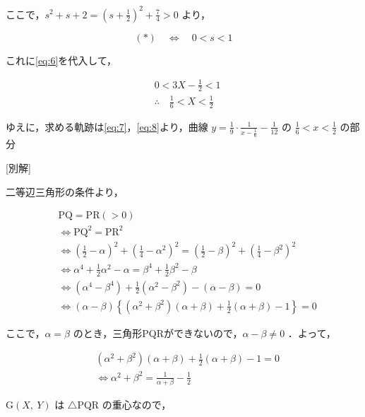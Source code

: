 \documentclass[a4paper]{ltjsarticle}
\begin{document}
ここで，$s^2+s+2=\left(s+\frac{1}{2}\right)^2+\frac{7}{4}>0$ より，

\begin{equation*}
    (*)\quad\Longleftrightarrow\quad 0<s<1
\end{equation*}

これに\eqref{eq:6}を代入して，

\begin{align}
     & 0<3X-\frac{1}{2}<1\nonumber                          \\
     & \therefore\quad\frac{1}{6}<X<\frac{1}{2}\label{eq:8}
\end{align}

ゆえに，求める軌跡は\eqref{eq:7}，\eqref{eq:8}より，曲線 $y=\frac{1}{9}\cdot\frac{1}{x-\frac{1}{6}}-\frac{1}{12}$ の $\frac{1}{6}<x<\frac{1}{2}$ の部分

[別解]

二等辺三角形の条件より，

\begin{align*}
     & \text{PQ}=\text{PR}(>0)                                                                                       \\
     & \Leftrightarrow \text{PQ}^2=\text{PR}^2                                                                       \\
     & \Leftrightarrow (\frac{1}{2}-\alpha)^2+(\frac{1}{4}-\alpha^2)^2=(\frac{1}{2}-\beta)^2+(\frac{1}{4}-\beta^2)^2 \\
     & \Leftrightarrow \alpha^4+\frac{1}{2}\alpha^2-\alpha=\beta^4+\frac{1}{2}\beta^2-\beta                          \\
     & \Leftrightarrow (\alpha^4-\beta^4)+\frac{1}{2}(\alpha^2-\beta^2)-(\alpha-\beta)=0                             \\
     & \Leftrightarrow (\alpha-\beta)\left\{(\alpha^2+\beta^2)(\alpha+\beta)+\frac{1}{2}(\alpha+\beta)-1\right\}=0
\end{align*}

ここで，$\alpha=\beta$ のとき，三角形PQRができないので，$\alpha-\beta\neq 0$ ．よって，

\begin{align}
     & (\alpha^2+\beta^2)(\alpha+\beta)+\frac{1}{2}(\alpha+\beta)-1=0\nonumber         \\
     & \Leftrightarrow \alpha^2+\beta^2=\frac{1}{\alpha+\beta}-\frac{1}{2}\label{eq:9}
\end{align}

G$(X,\ Y)$ は $\triangle$PQR の重心なので，
\end{document}
